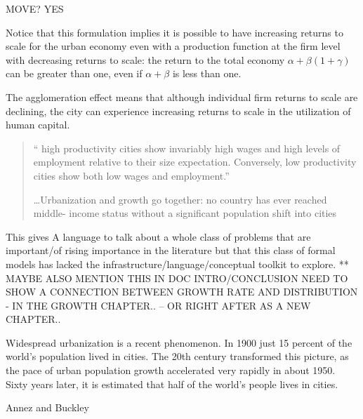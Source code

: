 MOVE?  YES

 Notice that this formulation implies it is possible to have increasing returns to scale for the urban economy even with a production function at the firm level with decreasing returns to scale: the return to the total economy $\alpha + \beta(1 + \gamma)$ can be greater than one, even if $\alpha +\beta$ is less than one. %
 
The \gls{agglomeration effect} means that although individual firm returns to scale are declining, the city can experience \gls{increasing returns to scale} in the utilization of human capital. %






\begin{quotation}`` high productivity cities show invariably high wages and high levels of employment relative to their size expectation. Conversely, low productivity cities show both low wages and employment.''

\dots Urbanization and growth go together: no country has ever reached middle- income status without a significant population shift into cities \cite{annezUrbanizationGrowthSetting2009}\end{quotation}




This gives 
A language to talk about a whole class of problems that are important/of rising importance in the literature but that this class of formal models has lacked the infrastructure/language/conceptual toolkit to explore. ** MAYBE ALSO MENTION THIS IN DOC INTRO/CONCLUSION
NEED TO SHOW A CONNECTION BETWEEN GROWTH RATE AND DISTRIBUTION - IN THE GROWTH CHAPTER.. -- OR RIGHT AFTER AS A NEW CHAPTER..



\epigraph{Widespread urbanization is a recent phenomenon. In 1900 just 15 percent of the world’s population lived in cities. The 20th century transformed this picture, as the pace of urban population growth accelerated very rapidly in about 1950. Sixty years later, it is estimated that half of the world’s people lives in cities.}{Annez and Buckley\cite{annezUrbanizationGrowthSetting2009}}


